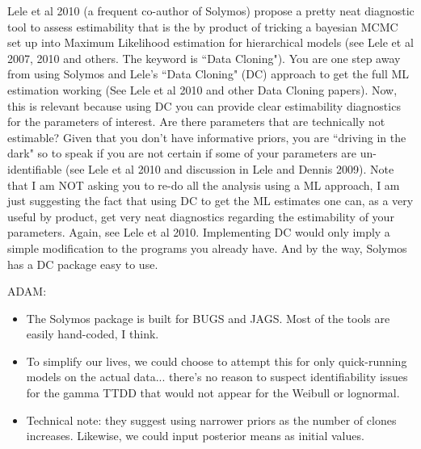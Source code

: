 \documentclass[12pt]{article}
\renewenvironment{quote}  %
              {\list{}{\rightmargin\leftmargin}\normalfont%
               \item\relax}
              {\endlist}
\newcommand{\adam}[1]{{\color{blue} ADAM: #1}}
\begin{document}
Lele et al 2010 (a frequent co-author of Solymos) propose a pretty neat diagnostic tool to assess
estimability that is the by product of tricking a bayesian MCMC set up into Maximum Likelihood estimation for hierarchical models (see Lele et al 2007, 2010 and others. The keyword is ``Data Cloning"). You are one step away from using Solymos and Lele's ``Data Cloning" (DC) approach to get the full ML estimation working (See Lele et al 2010 and other Data Cloning papers). Now, this is relevant because using DC you can provide clear estimability diagnostics for the parameters of interest.  Are there parameters that are technically not estimable?  Given that you don't have informative priors, you are ``driving in the dark" so to speak if you are not certain if some of your parameters are un-identifiable (see Lele et al 2010 and discussion in Lele and Dennis 2009).  Note that I am NOT asking you to re-do all the analysis using a ML approach, I am just suggesting the fact that using DC to get the ML estimates one can, as a very useful by product, get very neat diagnostics regarding
the estimability of your parameters.  Again, see Lele et al 2010.  Implementing DC would only imply a simple modification to the programs you already have. And by the way, Solymos has a DC package easy to use.
\begin{quote}
\adam{
\begin{itemize}
\item The Solymos package is built for BUGS and JAGS.  Most of the tools are easily hand-coded, I think.
\item To simplify our lives, we could choose to attempt this for only quick-running models on the actual data... there's no reason to suspect identifiability issues for the gamma TTDD that would not appear for the Weibull or lognormal.
\item Technical note: they suggest using narrower priors as the number of clones increases.  Likewise, we could input posterior means as initial values.
\end{itemize}
}
\end{quote}
\end{document}
